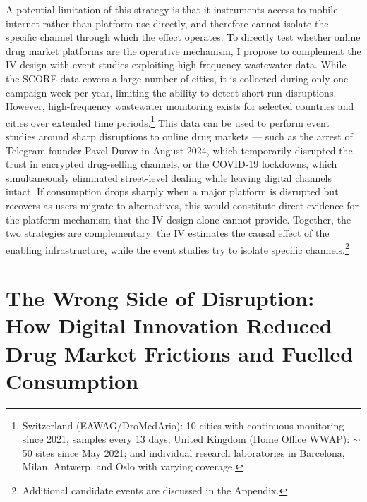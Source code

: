 \documentclass[12pt, a4paper]{article}
\begin{document}
A potential limitation of this strategy is that it instruments access to mobile internet rather than platform use directly, and therefore cannot isolate the specific channel through which the effect operates. To directly test whether online drug market platforms are the operative mechanism, I propose to complement the IV design with event studies exploiting high-frequency wastewater data. While the SCORE data covers a large number of cities, it is collected during only one campaign week per year, limiting the ability to detect short-run disruptions. However, high-frequency wastewater monitoring exists for selected countries and cities over extended time periods.\footnote{Switzerland (EAWAG/DroMedArio): 10 cities with continuous monitoring since 2021, samples every 13 days; United Kingdom (Home Office WWAP): $\sim$50 sites since May 2021; and individual research laboratories in Barcelona, Milan, Antwerp, and Oslo with varying coverage.} This data can be used to perform event studies around sharp disruptions to online drug markets --- such as the arrest of Telegram founder Pavel Durov in August 2024, which temporarily disrupted the trust in encrypted drug-selling channels, or the COVID-19 lockdowns, which simultaneously eliminated street-level dealing while leaving digital channels intact. If consumption drops sharply when a major platform is disrupted but recovers as users migrate to alternatives, this would constitute direct evidence for the platform mechanism that the IV design alone cannot provide. Together, the two strategies are complementary: the IV estimates the causal effect of the enabling infrastructure, while the event studies try to isolate specific channels.\footnote{Additional candidate events are discussed in the Appendix.}

\section{The Wrong Side of Disruption: How Digital Innovation Reduced Drug Market Frictions and Fuelled Consumption}


\end{document}

